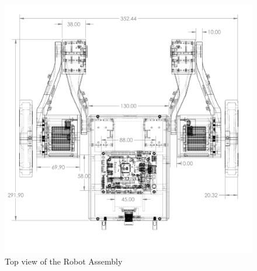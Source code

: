 \begin{figure}[h]
	\centering
	\includegraphics[width=\linewidth]{Robot_Assembly_V2_Top}
	\caption[Top view of the Robot Assembly]{Top view of the Robot Assembly}
	\label{fig:robotassemblyv2top}
\end{figure}

